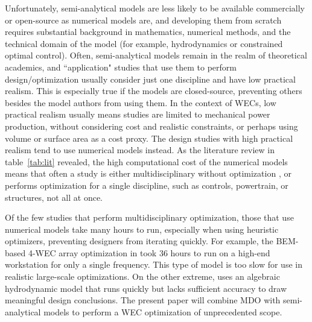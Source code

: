 Unfortunately, semi-analytical models are less likely to be available commercially or open-source as numerical models are, and developing them from scratch requires substantial background in mathematics, numerical methods, and the technical domain of the model (for example, hydrodynamics or constrained optimal control). Often, semi-analytical models remain in the realm of theoretical academics, and ``application" studies that use them to perform design/optimization usually consider just one discipline and have low practical realism. This is especially true if the models are closed-source, preventing others besides the model authors from using them. In the context of WECs, low practical realism usually means studies are limited to mechanical power production, without considering cost and realistic constraints, or perhaps using volume or surface area as a cost proxy. The design studies with high practical realism tend to use numerical models instead. As the literature review in table~\ref{tab:lit} revealed, the high computational cost of the numerical models means that often a study is either multidisciplinary without optimization \cite{RM3,mi_multi-scale_2025}, or performs optimization for a single discipline, such as controls, powertrain, or structures, not all at once. 

Of the few studies that perform multidisciplinary optimization, those that use numerical models take many hours to run, especially when using heuristic optimizers, preventing designers from iterating quickly. For example, the BEM-based 4-WEC array optimization in \cite{khanal_multi-objective_2024} took 36 hours to run on a high-end workstation for only a single frequency. This type of model is too slow for use in realistic large-scale optimizations. On the other extreme, \cite{mccabe_multidisciplinary_2022} uses an algebraic hydrodynamic model that runs quickly but lacks sufficient accuracy to draw meaningful design conclusions. The present paper will combine MDO with semi-analytical models to perform a WEC optimization of unprecedented scope.

